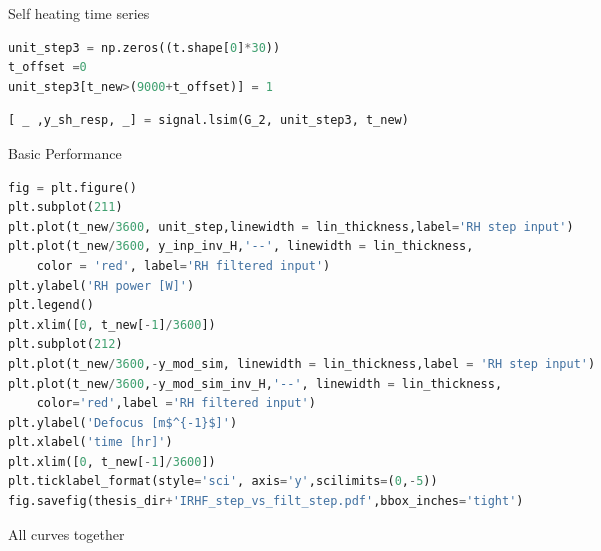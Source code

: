 \noindent Self heating time series

\begin{spacing}{1.2} \begin{lstlisting}[frame=single,language=Python]
unit_step3 = np.zeros((t.shape[0]*30))
t_offset =0
unit_step3[t_new>(9000+t_offset)] = 1
\end{lstlisting} \end{spacing}

\begin{spacing}{1.2} \begin{lstlisting}[frame=single,language=Python]
[ _ ,y_sh_resp, _] = signal.lsim(G_2, unit_step3, t_new)
\end{lstlisting} \end{spacing}

\noindent Basic Performance

\begin{spacing}{1.2} \begin{lstlisting}[frame=single,language=Python]
fig = plt.figure()
plt.subplot(211)
plt.plot(t_new/3600, unit_step,linewidth = lin_thickness,label='RH step input')
plt.plot(t_new/3600, y_inp_inv_H,'--', linewidth = lin_thickness,
    color = 'red', label='RH filtered input')
plt.ylabel('RH power [W]')
plt.legend()
plt.xlim([0, t_new[-1]/3600])
plt.subplot(212)
plt.plot(t_new/3600,-y_mod_sim, linewidth = lin_thickness,label = 'RH step input')
plt.plot(t_new/3600,-y_mod_sim_inv_H,'--', linewidth = lin_thickness,
    color='red',label ='RH filtered input')
plt.ylabel('Defocus [m$^{-1}$]')
plt.xlabel('time [hr]')
plt.xlim([0, t_new[-1]/3600])
plt.ticklabel_format(style='sci', axis='y',scilimits=(0,-5))
fig.savefig(thesis_dir+'IRHF_step_vs_filt_step.pdf',bbox_inches='tight')
\end{lstlisting} \end{spacing}



\noindent All curves together

